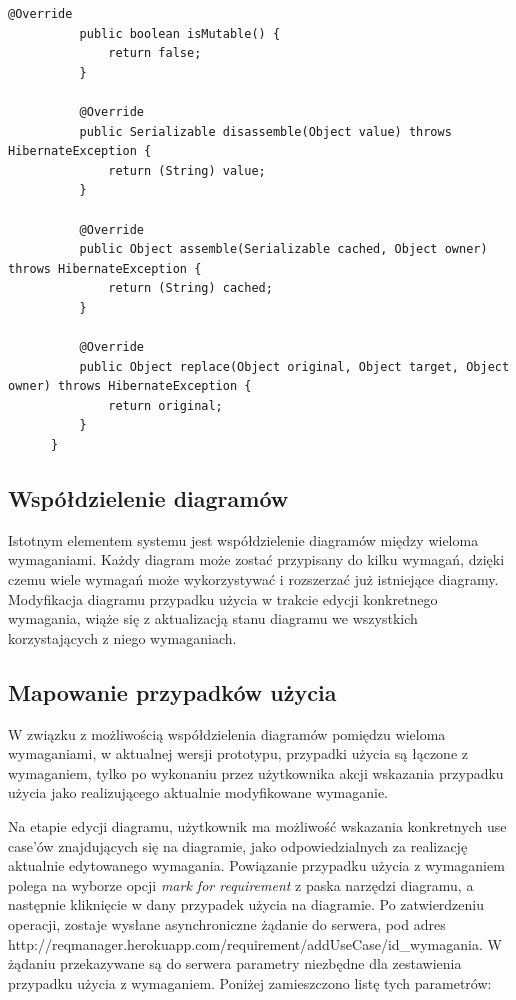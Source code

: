 \begin{lstlisting}[caption={implementacja niestandardowego typu SQLXMLType}, label={lst:xmlType}]
          @Override
          public boolean isMutable() {
              return false;
          }
       
          @Override
          public Serializable disassemble(Object value) throws HibernateException {
              return (String) value;
          }
       
          @Override
          public Object assemble(Serializable cached, Object owner) throws HibernateException {
              return (String) cached;
          }
       
          @Override
          public Object replace(Object original, Object target, Object owner) throws HibernateException {
              return original;
          }
      }
      \end{lstlisting}

    \subsection{Współdzielenie diagramów}

    Istotnym elementem systemu jest współdzielenie diagramów między wieloma wymaganiami. Każdy diagram może zostać przypisany do kilku wymagań, dzięki czemu wiele wymagań może wykorzystywać i rozszerzać już istniejące diagramy. Modyfikacja diagramu przypadku użycia w trakcie edycji konkretnego wymagania, wiąże się z aktualizacją stanu diagramu we wszystkich korzystających z niego wymaganiach.
    
    \subsection{Mapowanie przypadków użycia}
      W związku z możliwością współdzielenia diagramów pomiędzu wieloma wymaganiami, w aktualnej wersji prototypu, przypadki użycia są łączone z wymaganiem, tylko po wykonaniu przez użytkownika akcji wskazania przypadku użycia jako realizującego aktualnie modyfikowane wymaganie.

      Na etapie edycji diagramu, użytkownik ma możliwość wskazania konkretnych use case'ów znajdujących się na diagramie, jako odpowiedzialnych za realizację aktualnie edytowanego wymagania. Powiązanie przypadku użycia z wymaganiem polega na wyborze opcji \emph{mark for requirement} z paska narzędzi diagramu, a następnie kliknięcie w dany przypadek użycia na diagramie. Po zatwierdzeniu operacji, zostaje wysłane asynchroniczne żądanie do serwera, pod adres http://reqmanager.herokuapp.com/requirement/addUseCase/id\_wymagania. W żądaniu przekazywane są do serwera parametry niezbędne dla zestawienia przypadku użycia z wymaganiem. Poniżej zamieszczono listę tych parametrów:


